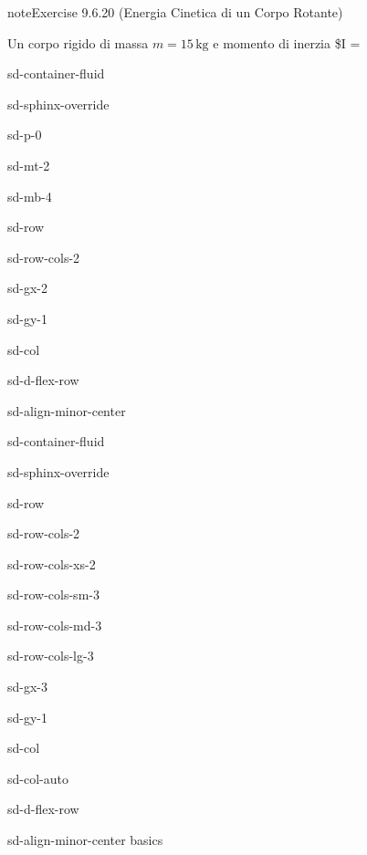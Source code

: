\documentclass[letterpaper,10pt,italian]{jupyterBook}
\begin{document}
\begin{sphinxadmonition}{note}{Exercise 9.6.20 (Energia Cinetica di un Corpo Rotante)}



\sphinxAtStartPar
Un corpo rigido di massa \(m = 15 \, \text{kg}\) e momento di inerzia \$I =
\end{sphinxadmonition}

\sphinxstepscope

\begin{sphinxuseclass}{sd-container-fluid}
\begin{sphinxuseclass}{sd-sphinx-override}
\begin{sphinxuseclass}{sd-p-0}
\begin{sphinxuseclass}{sd-mt-2}
\begin{sphinxuseclass}{sd-mb-4}
\begin{sphinxuseclass}{sd-row}
\begin{sphinxuseclass}{sd-row-cols-2}
\begin{sphinxuseclass}{sd-gx-2}
\begin{sphinxuseclass}{sd-gy-1}
\begin{sphinxuseclass}{sd-col}
\begin{sphinxuseclass}{sd-d-flex-row}
\begin{sphinxuseclass}{sd-align-minor-center}
\begin{sphinxuseclass}{sd-container-fluid}
\begin{sphinxuseclass}{sd-sphinx-override}
\begin{sphinxuseclass}{sd-row}
\begin{sphinxuseclass}{sd-row-cols-2}
\begin{sphinxuseclass}{sd-row-cols-xs-2}
\begin{sphinxuseclass}{sd-row-cols-sm-3}
\begin{sphinxuseclass}{sd-row-cols-md-3}
\begin{sphinxuseclass}{sd-row-cols-lg-3}
\begin{sphinxuseclass}{sd-gx-3}
\begin{sphinxuseclass}{sd-gy-1}
\begin{sphinxuseclass}{sd-col}
\begin{sphinxuseclass}{sd-col-auto}
\begin{sphinxuseclass}{sd-d-flex-row}
\begin{sphinxuseclass}{sd-align-minor-center}
\sphinxAtStartPar
basics


\end{sphinxuseclass}
\end{sphinxuseclass}
\end{sphinxuseclass}
\end{sphinxuseclass}
\end{sphinxuseclass}
\end{sphinxuseclass}
\end{sphinxuseclass}
\end{sphinxuseclass}
\end{sphinxuseclass}
\end{sphinxuseclass}
\end{sphinxuseclass}
\end{sphinxuseclass}
\end{sphinxuseclass}
\end{sphinxuseclass}
\end{sphinxuseclass}
\end{sphinxuseclass}
\end{sphinxuseclass}
\end{sphinxuseclass}
\end{sphinxuseclass}
\end{sphinxuseclass}
\end{sphinxuseclass}
\end{sphinxuseclass}
\end{sphinxuseclass}
\end{sphinxuseclass}
\end{sphinxuseclass}
\end{sphinxuseclass}
\end{document}
